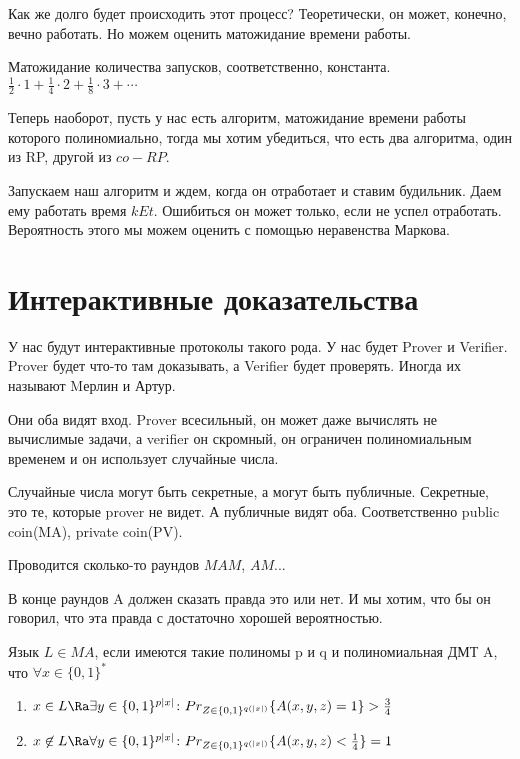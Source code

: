 Как же долго будет происходить этот процесс? Теоретически, он может, 
конечно, вечно работать. Но можем оценить матожидание времени работы. 

Матожидание количества запусков, соответственно, константа.
$\frac{1}{2}\cdot 1 + \frac{1}{4}\cdot 2 + \frac{1}{8}\cdot3 + \cdots$

Теперь наоборот, пусть у нас есть алгоритм, матожидание времени работы которого
полиномиально, тогда мы хотим убедиться, что есть два алгоритма, один из 
RP, другой из $co-RP$.

Запускаем наш алгоритм и ждем, когда он отработает и ставим будильник. 
Даем ему работать время $k Et$. Ошибиться он может только, если не успел 
отработать. Вероятность этого мы можем оценить с помощью неравенства Маркова. 

\section{Интерактивные доказательства}
У нас будут интерактивные протоколы такого рода. У нас будет Prover и Verifier. 
Prover будет что-то там доказывать, а Verifier будет проверять. Иногда
их называют Mерлин и Артур. 

Они оба видят вход. Prover всесильный, он может даже вычислять не вычислимые задачи, а 
verifier он скромный, он ограничен полиномиальным временем и он использует случайные числа. 

Случайные числа могут быть секретные, а могут быть публичные. Секретные, это те, которые 
prover не видет. А публичные видят оба. Соответственно public coin(MA), private coin(PV).

Проводится сколько-то раундов $MAM$, $AM$... 

В конце раундов A должен сказать правда это или нет. И мы хотим, что бы 
он говорил, что эта правда с достаточно хорошей вероятностью. 

\begin{Def}
Язык $L \in MA$, если имеются такие полиномы p и q и 
полиномиальная ДМТ A, что $\forall x \in \{0, 1\}^*$\\
\begin{enumerate}
\item $x \in L \Ra \exists y \in \{0, 1\}^{p|x|} \colon Pr_{Z \in \{0, 1\}^{q(|x|)}} \{A(x, y, z) = 1\} > \frac{3}{4}$ \\
\item  $x \not \in L \Ra \forall y \in \{0, 1\}^{p|x|} \colon Pr_{Z \in \{0, 1\}^{q(|x|)}} \{A(x, y, z) < \frac{1}{4}\} = 1$ \\

\end{enumerate}

\end{Def}

